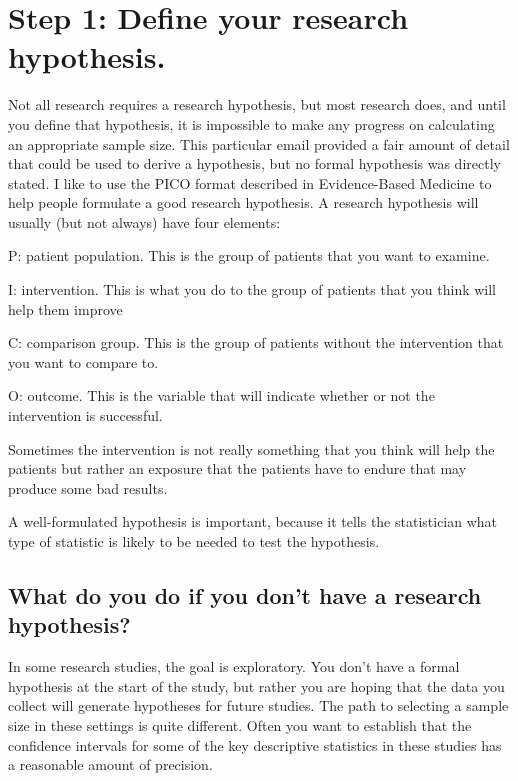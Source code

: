 \documentclass[
  letterpaper,
  DIV=11,
  numbers=noendperiod]{scrreprt}
\begin{document}
\section{Step 1: Define your research
hypothesis.}\label{step-1-define-your-research-hypothesis.}

Not all research requires a research hypothesis, but most research does,
and until you define that hypothesis, it is impossible to make any
progress on calculating an appropriate sample size. This particular
email provided a fair amount of detail that could be used to derive a
hypothesis, but no formal hypothesis was directly stated. I like to use
the PICO format described in Evidence-Based Medicine to help people
formulate a good research hypothesis. A research hypothesis will usually
(but not always) have four elements:

P: patient population. This is the group of patients that you want to
examine.

I: intervention. This is what you do to the group of patients that you
think will help them improve

C: comparison group. This is the group of patients without the
intervention that you want to compare to.

O: outcome. This is the variable that will indicate whether or not the
intervention is successful.

Sometimes the intervention is not really something that you think will
help the patients but rather an exposure that the patients have to
endure that may produce some bad results.

A well-formulated hypothesis is important, because it tells the
statistician what type of statistic is likely to be needed to test the
hypothesis.

\subsection{What do you do if you don't have a research
hypothesis?}\label{what-do-you-do-if-you-dont-have-a-research-hypothesis}

In some research studies, the goal is exploratory. You don't have a
formal hypothesis at the start of the study, but rather you are hoping
that the data you collect will generate hypotheses for future studies.
The path to selecting a sample size in these settings is quite
different. Often you want to establish that the confidence intervals for
some of the key descriptive statistics in these studies has a reasonable
amount of precision.
\end{document}
